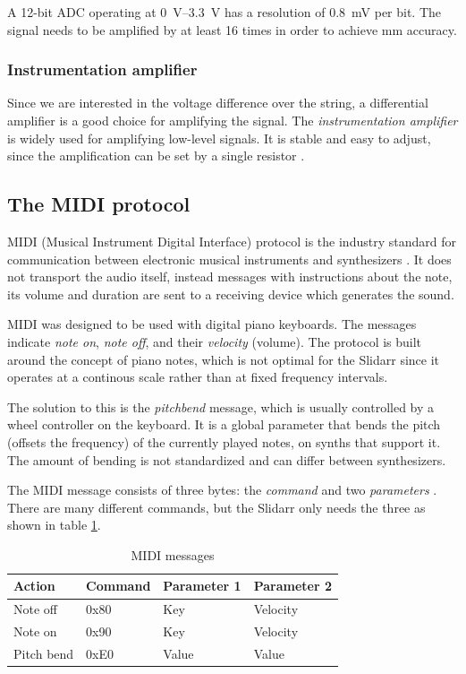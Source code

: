 \documentclass{article}
\begin{document}
A 12-bit ADC operating at \SIrange{0}{3.3}{\volt} has a resolution of \SI{0.8}{\milli\volt} per bit. The signal needs to be amplified by at least 16 times in order to achieve \si{\milli\meter} accuracy.

\subsubsection{Instrumentation amplifier}
Since we are interested in the voltage difference over the string, a differential amplifier is a good choice for amplifying the signal. The \textit{instrumentation amplifier} is widely used for amplifying low-level signals. It is stable and easy to adjust, since the amplification can be set by a single resistor \cite{in}.

\subsection{The MIDI protocol}
MIDI (Musical Instrument Digital Interface) protocol is the industry standard for communication between electronic musical instruments and synthesizers \cite{midiorg}. It does not transport the audio itself, instead messages with instructions about the note, its volume and duration are sent to a receiving device which generates the sound. 

MIDI was designed to be used with digital piano keyboards. The messages indicate \textit{note on}, \textit{note off}, and their \textit{velocity} (volume). The protocol is built around the concept of piano notes, which is not optimal for the Slidarr since it operates at a continous scale rather than at fixed frequency intervals.

The solution to this is the \textit{pitchbend} message, which is usually controlled by a wheel controller on the keyboard. It is a global parameter that bends the pitch (offsets the frequency) of the currently played notes, on synths that support it. The amount of bending is not standardized and can differ between synthesizers.

The MIDI message consists of three bytes: the \textit{command} and two \textit{parameters} \cite{midistanford}. There are many different commands, but the Slidarr only needs the three as shown in table \ref{table:midi_msgs}.

\begin{table}[h]
  \centering
  \caption{MIDI messages}
  \label{table:midi_msgs}
  \begin{tabular}{llll}
    Action     & Command & Parameter 1 & Parameter 2 \\ \hline
    Note off   & 0x80    & Key         & Velocity    \\
    Note on    & 0x90    & Key         & Velocity    \\
    Pitch bend & 0xE0    & Value       & Value      
  \end{tabular}
\end{table}
\end{document}
